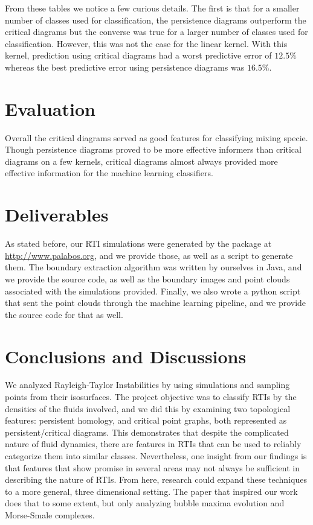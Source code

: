 \documentclass[12pt, fullpage,letterpaper]{article}
\theoremstyle{definition}
\begin{document}
	From these tables we notice a few curious details. The first is that for a smaller number of classes used for classification, the persistence diagrams outperform the critical diagrams but the converse was true for a larger number of classes used for classification. However, this was not the case for the linear kernel. With this kernel, prediction using critical diagrams had a worst predictive error of $12.5\%$ whereas the best predictive error using persistence diagrams was $16.5\%$. 

\section*{\normalfont Evaluation}
Overall the critical diagrams served as good features for classifying mixing specie. Though persistence diagrams proved to be more effective informers than critical diagrams on a few kernels, critical diagrams almost always provided more effective information for the machine learning classifiers.

\section*{\normalfont Deliverables} As stated before, our RTI simulations were generated by the package at \url{http://www.palabos.org}, and we provide those, as well as a script to generate them. The boundary extraction algorithm was written by ourselves in Java, and we provide the source code, as well as the boundary images and point clouds associated with the simulations provided. Finally, we also wrote a python script that sent the point clouds through the machine learning pipeline, and we provide the source code for that as well.

\section*{\normalfont Conclusions and Discussions}
	We analyzed Rayleigh-Taylor Instabilities by using simulations and sampling points from their isosurfaces. The project objective was to classify RTIs by the densities of the fluids involved, and we did this by examining two topological features: persistent homology, and critical point graphs, both represented as persistent/critical diagrams. This demonstrates that despite the complicated nature of fluid dynamics, there are features in RTIs that can be used to reliably categorize them into similar classes. Nevertheless, one insight from our findings is that features that show promise in several areas may not always be sufficient in describing the nature of RTIs. From here, research could expand these techniques to a more general, three dimensional setting. The paper that inspired our work does that to some extent, but only analyzing bubble maxima evolution and Morse-Smale complexes.
{}

\end{document}
